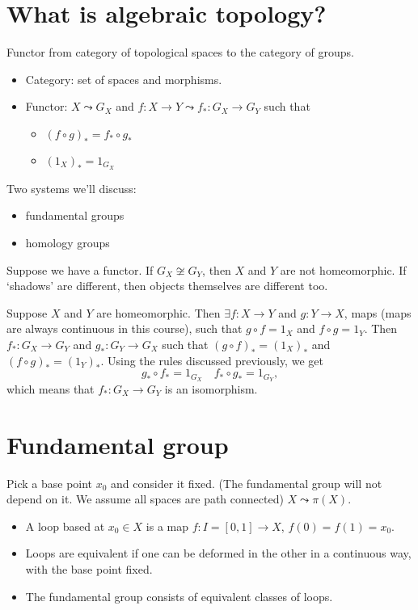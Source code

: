 \section{What is algebraic topology?}
Functor from category of topological spaces to the category of groups.
\begin{itemize}
    \item Category: set of spaces and morphisms.
    \item Functor: $X \leadsto G_X$ and  $f:X\to Y \leadsto f_*: G_X \to  G_Y$ such that
        \begin{itemize}
            \item $(f \circ g)_* = f_* \circ g_* $
            \item $(1_X)_* = 1_{G_X}$
        \end{itemize}
\end{itemize}

Two systems we'll discuss:
\begin{itemize}
    \item fundamental groups
    \item homology groups
\end{itemize}


\begin{eg}
    Suppose we have a functor.
    If $G_X \not\cong G_Y$, then  $X$ and  $Y$ are not homeomorphic.
    If `shadows' are different, then objects themselves are different too.
\end{eg}
\begin{explanation}
    Suppose $X$ and $Y$ are homeomorphic.
    Then $\exists f: X \to  Y$ and $g: Y \to  X$, maps (maps are always continuous in this course), such that $g  \circ f = 1_X$ and $f \circ g = 1_Y$.
    Then $f_*: G_X \to G_Y$ and $g_*: G_Y \to  G_X$ such that $(g \circ f)_* = (1_X)_*$ and  $(f \circ g)_* = (1_Y)_*$. Using the rules discussed previously, we get
    \[
    g_*  \circ f_* = 1_{G_X} \quad f_*  \circ  g_* = 1_{G_Y}
    ,\] 
    which means that $f_* : G_X \to  G_Y$ is an isomorphism.
\end{explanation}

\section{Fundamental group}
Pick a base point $x_0$ and consider it fixed. (The fundamental group will not depend on it. We assume all spaces are path connected)
$X \leadsto \pi(X)$.
\begin{itemize}
    \item A loop based at $x_0 \in X$ is a map $f: I = [0, 1] \to X$, $f(0) = f(1) = x_0$.
    \item Loops are equivalent if one can be deformed in the other in a continuous way, with the base point fixed.
    \item The fundamental group consists of equivalent classes of loops.
\end{itemize}

